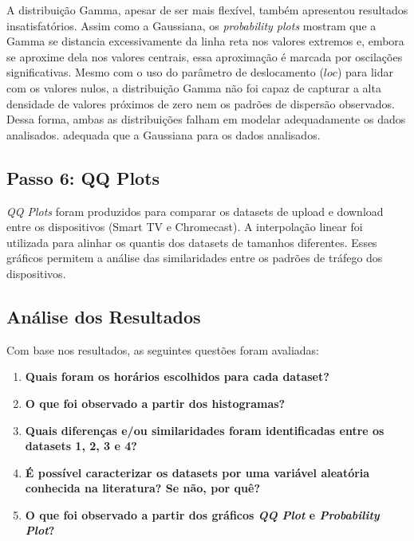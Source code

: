 A distribuição Gamma, apesar de ser mais flexível, também apresentou resultados insatisfatórios. Assim como a Gaussiana, os \textit{probability plots} mostram que a Gamma se distancia excessivamente da linha reta nos valores extremos e, embora se aproxime dela nos valores centrais, essa aproximação é marcada por oscilações significativas. Mesmo com o uso do parâmetro de deslocamento (\(loc\)) para lidar com os valores nulos, a distribuição Gamma não foi capaz de capturar a alta densidade de valores próximos de zero nem os padrões de dispersão observados. Dessa forma, ambas as distribuições falham em modelar adequadamente os dados analisados.
adequada que a Gaussiana para os dados analisados.


\subsection{Passo 6: QQ Plots}

\textit{QQ Plots} foram produzidos para comparar os datasets de upload e download entre os dispositivos (Smart TV e Chromecast). A interpolação linear foi utilizada para alinhar os quantis dos datasets de tamanhos diferentes. Esses gráficos permitem a análise das similaridades entre os padrões de tráfego dos dispositivos.

\subsection{Análise dos Resultados}

Com base nos resultados, as seguintes questões foram avaliadas:
\begin{enumerate}
    \item \textbf{Quais foram os horários escolhidos para cada dataset?}
    \item \textbf{O que foi observado a partir dos histogramas?}
    \item \textbf{Quais diferenças e/ou similaridades foram identificadas entre os datasets 1, 2, 3 e 4?}
    \item \textbf{É possível caracterizar os datasets por uma variável aleatória conhecida na literatura? Se não, por quê?}
    \item \textbf{O que foi observado a partir dos gráficos \textit{QQ Plot} e \textit{Probability Plot}?}
\end{enumerate}
